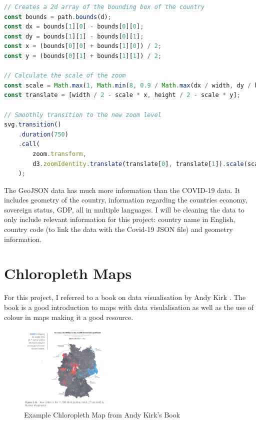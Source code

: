 \documentclass{report}
\begin{document}
\begin{lstlisting}[language=JavaScript]
// Creates a 2d array of the bounding box of the country
const bounds = path.bounds(d);
const dx = bounds[1][0] - bounds[0][0];
const dy = bounds[1][1] - bounds[0][1];
const x = (bounds[0][0] + bounds[1][0]) / 2;
const y = (bounds[0][1] + bounds[1][1]) / 2;

// Calculate the scale of the zoom
const scale = Math.max(1, Math.min(8, 0.9 / Math.max(dx / width, dy / height)));
const translate = [width / 2 - scale * x, height / 2 - scale * y];

// Smoothly transition to the new zoom level
svg.transition()
    .duration(750)
    .call(
        zoom.transform,
        d3.zoomIdentity.translate(translate[0], translate[1]).scale(scale)
    );
\end{lstlisting}

The GeoJSON data has much more information than the COVID-19 data. It includes geometry of the country, information regarding the countries economy, sovereign status, GDP, all in multiple languages. I will be cleaning the data to only include relevant information for this project: country name in English, country code (to link the data with the Covid-19 JSON file) and geometry information. 

\section{Chloropleth Maps}
For this project, I referred to a book on data visualisation by Andy Kirk \cite{andy2019kirk}. The book is a good introduction to maps with data visulalisation as well as the use of colour in maps making it a good resource. \\

\begin{figure}
    \begin{center}
      \includegraphics[width=0.38\textwidth]{chloropleth-example.png}
    \end{center}
    \caption{Example Chloropleth Map from Andy Kirk's Book \cite{andy2019kirk}}
  \end{figure}
\end{document}
